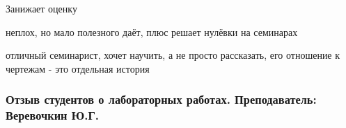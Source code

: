             \begin{commentbox} 
                Занижает оценку  
            \end{commentbox} 
        
            \begin{commentbox} 
                неплох, но мало полезного даёт, плюс решает нулёвки на семинарах 
            \end{commentbox} 
        
            \begin{commentbox} 
                отличный семинарист, хочет научить, а не просто рассказать, его отношение к чертежам - это отдельная история 
            \end{commentbox}


    \subsubsection{Отзыв студентов о лабораторных работах. Преподаватель: Веревочкин Ю.Г.}
